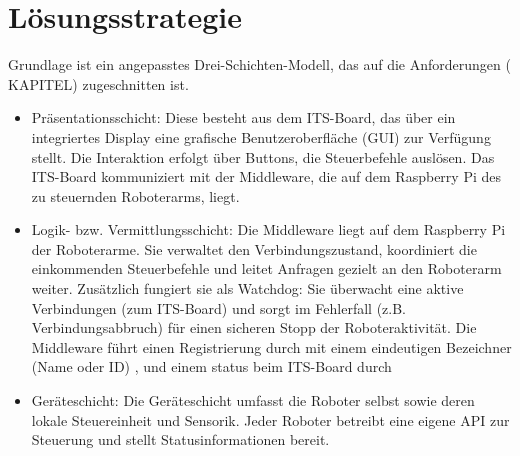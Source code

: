 \chapter{Lösungsstrategie}


Grundlage ist ein angepasstes Drei-Schichten-Modell, das auf die Anforderungen ( KAPITEL)
zugeschnitten ist.
 

\begin{itemize}
	\item{Präsentationsschicht:} Diese besteht aus dem ITS-Board, das über ein integriertes Display eine grafische Benutzeroberfläche (GUI) zur Verfügung stellt. Die Interaktion erfolgt über Buttons, die Steuerbefehle auslösen. Das ITS-Board kommuniziert mit der Middleware, die auf dem Raspberry Pi des zu steuernden Roboterarms, liegt.
	
	\item{Logik- bzw. Vermittlungsschicht:} Die Middleware liegt auf dem Raspberry Pi der Roboterarme. Sie verwaltet den Verbindungszustand, koordiniert die einkommenden Steuerbefehle und leitet Anfragen gezielt an den Roboterarm weiter. Zusätzlich fungiert sie als Watchdog: Sie überwacht eine aktive Verbindungen (zum ITS-Board) und sorgt im Fehlerfall (z.B. Verbindungsabbruch) für einen sicheren Stopp der Roboteraktivität. Die Middleware führt einen Registrierung durch mit einem eindeutigen Bezeichner (Name oder ID) , und einem status beim ITS-Board durch
	
	\item{Geräteschicht:} Die Geräteschicht umfasst die Roboter selbst sowie deren lokale Steuereinheit und Sensorik. Jeder Roboter betreibt eine eigene API zur Steuerung und stellt Statusinformationen bereit. 	
\end{itemize} 

